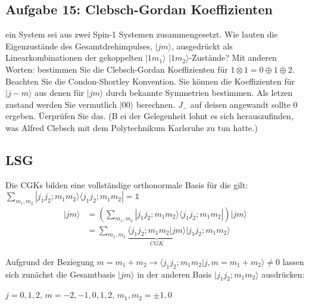



\subsection*{Aufgabe 15: Clebsch-Gordan Koeffizienten}

ein System sei aus zwei Spin-1 Systemen zusammengesetzt. Wie lauten die Eigenzustände des Gesamtdrehimpulses, \(|jm\rangle\), ausgedrückt als Linearkombinationen der gekoppelten \(|1m_1\rangle\) \(|1m_2\rangle\)-Zustände? Mit anderen Worten: bestimmen Sie die Clebsch-Gordan Koeffizienten für \(1\otimes 1=0\oplus 1\oplus 2\). Beachten Sie die Condon-Shortley Konvention. Sie können die Koeffizienten für \(|j-m\rangle\) aus denen für \(|jm\rangle\) durch bekannte Symmetrien bestimmen. Als letzen zustand werden Sie vermutlich \(|00\rangle\) berechnen. \(J_-\) auf deisen angewandt sollte 0 ergeben. Üerprüfen Sie das. (B ei der Gelegenheit lohnt es sich herauszufinden, was Alfred Clebsch mit dem Polytechnikum Karlsruhe zu tun hatte.)

\subsection*{LSG}


Die CGKs bilden eine vollständige orthonormale Basis für die gilt: \(\sum_{m_1,m_2}|j_1j_2;m_1m_2\rangle\langle j_1j_2;m_1m_2|=\mathbb 1\)
\begin{align}
|jm\rangle &= \left(\sum_{m_1,m_2}|j_1j_2;m_1m_2\rangle\langle j_1j_2;m_1m_2|\right)|jm\rangle \\
&= \sum_{m_1,m_2} \underbrace{\langle j_1j_2;m_1m_2|jm\rangle}_{CGK}|j_1j_2;m_1m_2 \rangle
\end{align}


Aufgrund der Beziegung \(m=m_1+m_2 \rightarrow \langle j_1j_2;m_1m_2|j,m=m_1+m_2\rangle \neq 0 \) lassen sich zunächst die Gesamtbasis \(|jm\rangle\) in der anderen Basis \(|j_1j_2;m_1m_2 \rangle\) ausdrücken:

\(j=0,1,2\), \(m=-2,-1,0,1,2\), \(m_1,m_2=\pm 1,0\)


